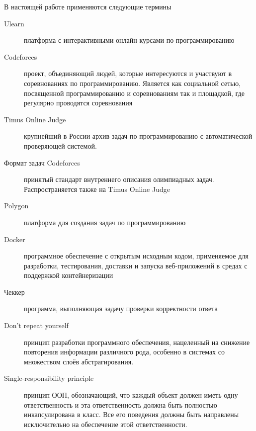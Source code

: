 \Defines %
В настоящей работе применяются следующие термины
\begin{description}
\item[Ulearn] платформа с интерактивными онлайн-курсами по программированию
\item[Codeforces] проект, объединяющий людей, которые интересуются и участвуют в соревнованиях по программированию. Является как социальной сетью, посвященной программированию и соревнованиям так и площадкой, где регулярно проводятся соревнования
\item[Timus Online Judge] крупнейший в России архив задач по программированию с автоматической проверяющей системой.
\item[Формат задач Codeforces] принятый стандарт внутреннего описания олимпиадных задач. Распространяется также на Timus Online Judge
\item[Polygon] платформа для создания задач по программированию
\item[Docker] программное обеспечение с открытым исходным кодом, применяемое для разработки, тестирования, доставки и запуска веб-приложений в средах с поддержкой контейнеризации
\item[Чеккер] программа, выполняющая задачу проверки корректности ответа

\item[Don’t repeat yourself] принцип разработки программного обеспечения, нацеленный на снижение повторения информации различного рода, особенно в системах со множеством слоёв абстрагирования.
\item[Single-responsibility principle] принцип ООП, обозначающий, что каждый объект должен иметь одну ответственность и эта ответственность должна быть полностью инкапсулирована в класс. Все его поведения должны быть направлены исключительно на обеспечение этой ответственности.
\end{description}
